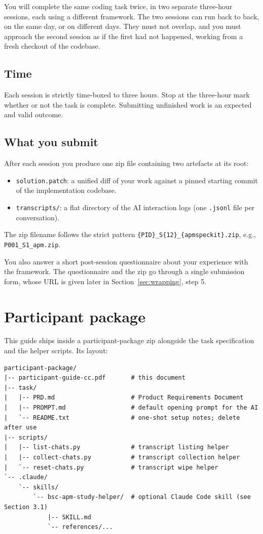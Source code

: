 \documentclass[11pt, a4paper]{article}
\begin{document}
You will complete the same coding task twice, in two separate three-hour sessions, each using a different framework. The two sessions can run back to back, on the same day, or on different days. They must not overlap, and you must approach the second session as if the first had not happened, working from a fresh checkout of the codebase.

\subsection{Time}
\label{sec:time}

Each session is strictly time-boxed to three hours. Stop at the three-hour mark whether or not the task is complete. Submitting unfinished work is an expected and valid outcome.

\subsection{What you submit}
\label{sec:whatyousubmit}

After each session you produce one zip file containing two artefacts at its root:

\begin{itemize}
    \item \texttt{solution.patch}: a unified diff of your work against a pinned starting commit of the implementation codebase.
    \item \texttt{transcripts/}: a flat directory of the AI interaction logs (one \texttt{.jsonl} file per conversation).
\end{itemize}

The zip filename follows the strict pattern \texttt{\{PID\}\_S\{1\textbar{}2\}\_\{apm\textbar{}speckit\}.zip}, e.g., \texttt{P001\_S1\_apm.zip}.

You also answer a short post-session questionnaire about your experience with the framework. The questionnaire and the zip go through a single submission form, whose URL is given later in Section~\ref{sec:wrapping}, step 5.

\section{Participant package}
\label{sec:package}

This guide ships inside a participant-package zip alongside the task specification and the helper scripts. Its layout:

\begin{verbatim}
participant-package/
|-- participant-guide-cc.pdf       # this document
|-- task/
|   |-- PRD.md                     # Product Requirements Document
|   |-- PROMPT.md                  # default opening prompt for the AI
|   `-- README.txt                 # one-shot setup notes; delete after use
|-- scripts/
|   |-- list-chats.py              # transcript listing helper
|   |-- collect-chats.py           # transcript collection helper
|   `-- reset-chats.py             # transcript wipe helper
`-- .claude/
    `-- skills/
        `-- bsc-apm-study-helper/  # optional Claude Code skill (see Section 3.1)
            |-- SKILL.md
            `-- references/...
\end{verbatim}
\end{document}

